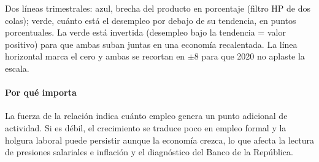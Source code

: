 \begin{leer}
Dos líneas trimestrales: azul, brecha del producto en porcentaje (filtro HP de dos colas); verde, cuánto está el desempleo por debajo de su tendencia, en puntos porcentuales. La verde está invertida (desempleo bajo la tendencia = valor positivo) para que ambas suban juntas en una economía recalentada. La línea horizontal marca el cero y ambas se recortan en $\pm$8 para que 2020 no aplaste la escala.
\end{leer}

\paragraph{Por qué importa}
La fuerza de la relación indica cuánto empleo genera un punto adicional de actividad. Si es débil, el crecimiento se traduce poco en empleo formal y la holgura laboral puede persistir aunque la economía crezca, lo que afecta la lectura de presiones salariales e inflación y el diagnóstico del Banco de la República.

